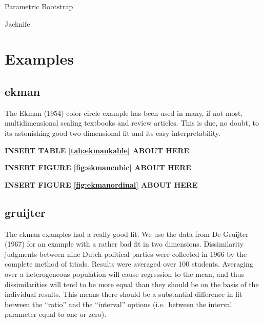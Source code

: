 \documentclass[
  12pt,
]{article}
\begin{document}
Parametric Bootstrap

Jacknife

\section{Examples}\label{examples}

\subsection{ekman}\label{ekman}

The Ekman (1954) color circle example has been used in many, if not most, multidimensional scaling textbooks and review articles. This is due, no doubt,
to its astonishing good two-dimensional fit and its easy interpretability.

\begin{greybox}

\begin{center}
\textbf{INSERT TABLE \ref{tab:ekmankable} ABOUT HERE}

\end{center}

\end{greybox}

\begin{greybox}

\begin{center}
\textbf{INSERT FIGURE \ref{fig:ekmancubic} ABOUT HERE}

\end{center}

\end{greybox}

\begin{greybox}

\begin{center}
\textbf{INSERT FIGURE \ref{fig:ekmanordinal} ABOUT HERE}

\end{center}

\end{greybox}

\subsection{gruijter}\label{gruijter}

The ekman examples had a really good fit. We use the data from De Gruijter (1967)
for an example with a rather bad fit in two dimensions.
Dissimilarity judgments between nine Dutch political parties were
collected in 1966 by the complete method of triads. Results were
averaged over 100 students. Averaging over a heterogeneous population
will cause regression to the mean, and thus dissimilarities will tend
to be more equal than they should be on the basis of the individual
results. This means there should be a substantial difference in fit between
the ``ratio'' and the ``interval'' options
(i.e.~between the interval parameter equal to one or zero).
\end{document}
